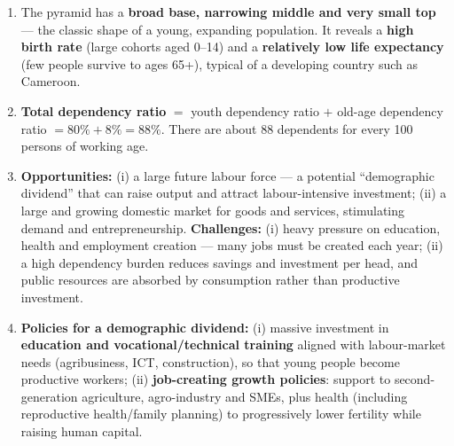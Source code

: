 \documentclass[11pt]{article}
\begin{document}
\begin{corrige}
\begin{enumerate}
\item The pyramid has a \textbf{broad base, narrowing middle and very small top} — the classic shape of a young, expanding population. It reveals a \textbf{high birth rate} (large cohorts aged 0--14) and a \textbf{relatively low life expectancy} (few people survive to ages 65+), typical of a developing country such as Cameroon.
\item \textbf{Total dependency ratio} $=$ youth dependency ratio $+$ old-age dependency ratio $= 80\% + 8\% = 88\%$. There are about 88 dependents for every 100 persons of working age.
\item \textbf{Opportunities:} (i) a large future labour force — a potential ``demographic dividend'' that can raise output and attract labour-intensive investment; (ii) a large and growing domestic market for goods and services, stimulating demand and entrepreneurship. \textbf{Challenges:} (i) heavy pressure on education, health and employment creation — many jobs must be created each year; (ii) a high dependency burden reduces savings and investment per head, and public resources are absorbed by consumption rather than productive investment.
\item \textbf{Policies for a demographic dividend:} (i) massive investment in \textbf{education and vocational/technical training} aligned with labour-market needs (agribusiness, ICT, construction), so that young people become productive workers; (ii) \textbf{job-creating growth policies}: support to second-generation agriculture, agro-industry and SMEs, plus health (including reproductive health/family planning) to progressively lower fertility while raising human capital.
\end{enumerate}
\end{corrige}
\end{document}
